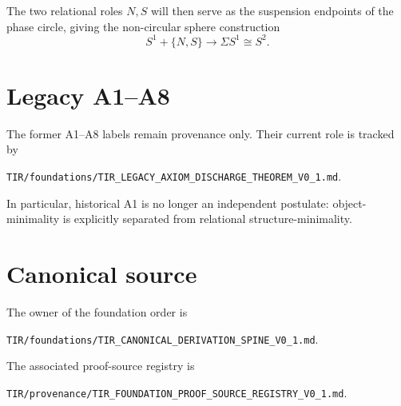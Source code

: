 The two relational roles $N,S$ will then serve as the suspension endpoints of the phase circle, giving the non-circular sphere construction
\begin{equation}
S^1+\{N,S\}\longrightarrow\Sigma S^1\cong S^2.
\end{equation}

\section{Legacy A1--A8}

The former A1--A8 labels remain provenance only. Their current role is tracked by
\begin{center}
\texttt{TIR/foundations/TIR\_LEGACY\_AXIOM\_DISCHARGE\_THEOREM\_V0\_1.md}.
\end{center}
In particular, historical A1 is no longer an independent postulate: object-minimality is explicitly separated from relational structure-minimality.

\section{Canonical source}

The owner of the foundation order is
\begin{center}
\texttt{TIR/foundations/TIR\_CANONICAL\_DERIVATION\_SPINE\_V0\_1.md}.
\end{center}
The associated proof-source registry is
\begin{center}
\texttt{TIR/provenance/TIR\_FOUNDATION\_PROOF\_SOURCE\_REGISTRY\_V0\_1.md}.
\end{center}
